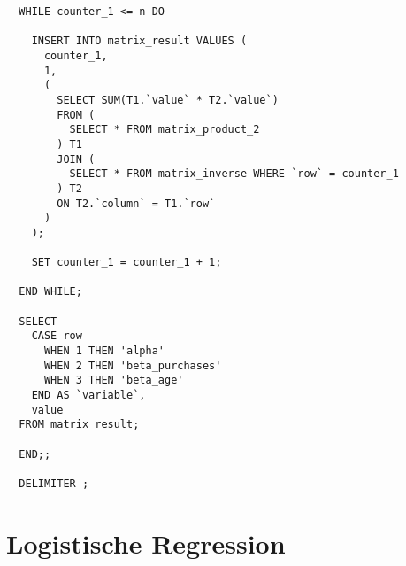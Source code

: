 \begin{verbatim}
  WHILE counter_1 <= n DO

    INSERT INTO matrix_result VALUES (
      counter_1,
      1,
      (
        SELECT SUM(T1.`value` * T2.`value`)
        FROM (
          SELECT * FROM matrix_product_2
        ) T1
        JOIN (
          SELECT * FROM matrix_inverse WHERE `row` = counter_1
        ) T2
        ON T2.`column` = T1.`row`
      )
    );

    SET counter_1 = counter_1 + 1;

  END WHILE;

  SELECT
    CASE row
      WHEN 1 THEN 'alpha'
      WHEN 2 THEN 'beta_purchases'
      WHEN 3 THEN 'beta_age'
    END AS `variable`,
    value
  FROM matrix_result;

  END;;

  DELIMITER ;
\end{verbatim}

\section{Logistische Regression}
\label{appendix:D:3}

